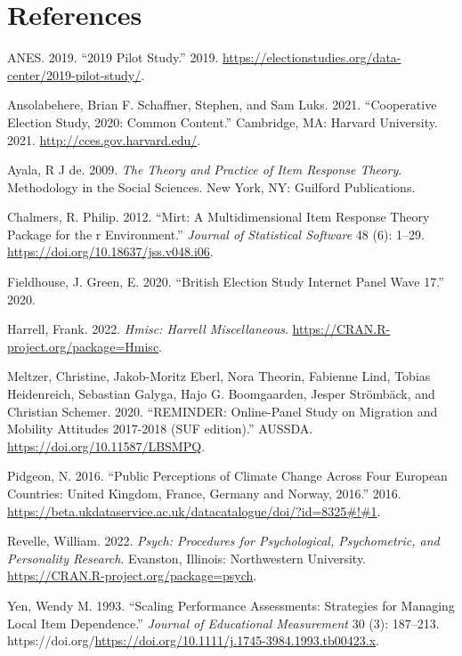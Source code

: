 \documentclass[11pt,halfline,a4paper,]{ouparticle}
\newlength{\cslhangindent}
\newenvironment{CSLReferences}[2] %
 {%
  \setlength{\parindent}{0pt}
  \ifodd #1 \everypar{\setlength{\hangindent}{\cslhangindent}}\ignorespaces\fi
  \ifnum #2 > 0
  \setlength{\parskip}{#2\baselineskip}
  \fi
 }%
 {}
\begin{document}
\hypertarget{references}{%
\section*{References}\label{references}}

\hypertarget{refs}{}
\begin{CSLReferences}{1}{0}
\leavevmode{}%
ANES. 2019. {``2019 Pilot Study.''} 2019.
\url{https://electionstudies.org/data-center/2019-pilot-study/}.

\leavevmode{}%
Ansolabehere, Brian F. Schaffner, Stephen, and Sam Luks. 2021.
{``Cooperative Election Study, 2020: Common Content.''} Cambridge, MA:
Harvard University. 2021. \url{http://cces.gov.harvard.edu/}.

\leavevmode{}%
Ayala, R J de. 2009. \emph{The Theory and Practice of Item Response
Theory}. Methodology in the Social Sciences. New York, NY: Guilford
Publications.

\leavevmode{}%
Chalmers, R. Philip. 2012. {``Mirt: A Multidimensional Item Response
Theory Package for the r Environment.''} \emph{Journal of Statistical
Software} 48 (6): 1--29. \url{https://doi.org/10.18637/jss.v048.i06}.

\leavevmode{}%
Fieldhouse, J. Green, E. 2020. {``British Election Study Internet Panel
Wave 17.''} 2020.

\leavevmode{}%
Harrell, Frank. 2022. \emph{Hmisc: Harrell Miscellaneous}.
\url{https://CRAN.R-project.org/package=Hmisc}.

\leavevmode{}%
Meltzer, Christine, Jakob-Moritz Eberl, Nora Theorin, Fabienne Lind,
Tobias Heidenreich, Sebastian Galyga, Hajo G. Boomgaarden, Jesper
Strömbäck, and Christian Schemer. 2020. {``{REMINDER: Online-Panel Study
on Migration and Mobility Attitudes 2017-2018 (SUF edition)}.''} AUSSDA.
\url{https://doi.org/10.11587/LBSMPQ}.

\leavevmode{}%
Pidgeon, N. 2016. {``Public Perceptions of Climate Change Across Four
European Countries: United Kingdom, France, Germany and Norway, 2016.''}
2016.
\url{https://beta.ukdataservice.ac.uk/datacatalogue/doi/?id=8325\#!\#1}.

\leavevmode{}%
Revelle, William. 2022. \emph{Psych: Procedures for Psychological,
Psychometric, and Personality Research}. Evanston, Illinois:
Northwestern University. \url{https://CRAN.R-project.org/package=psych}.

\leavevmode{}%
Yen, Wendy M. 1993. {``Scaling Performance Assessments: Strategies for
Managing Local Item Dependence.''} \emph{Journal of Educational
Measurement} 30 (3): 187--213.
https://doi.org/\url{https://doi.org/10.1111/j.1745-3984.1993.tb00423.x}.

\end{CSLReferences}
\end{document}
